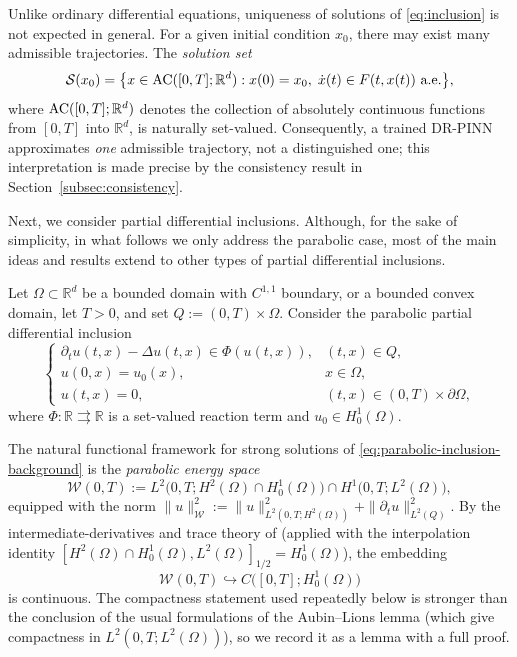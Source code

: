 \documentclass[11pt]{elsarticle}
\theoremstyle{definition}
\theoremstyle{remark}
\numberwithin{equation}{section}
\begin{document}
	Unlike ordinary differential equations, uniqueness of solutions of
	\eqref{eq:inclusion} is not expected in general.  For a given initial
	condition $x_0$, there may exist many admissible trajectories.  The
	\emph{solution set}
	\begin{equation}\label{eq:solution-DI}
		\mathcal{S}(x_0)
		=
		\bigl\{
		x\in {\rm AC}([0,T];\mathbb{R}^d):
		x(0)=x_0,\;
		\dot{x}(t)\in F(t,x(t))\ \text{a.e.}
		\bigr\},
	\end{equation}
	where ${\rm AC}([0,T];\mathbb{R}^d)$ denotes the collection of
	absolutely continuous functions from $[0,T]$ into $\mathbb{R}^d$,
	is naturally set-valued.  Consequently, a trained DR-PINN approximates
	\emph{one} admissible trajectory, not a distinguished one; this
	interpretation is made precise by the consistency result in
	Section~\ref{subsec:consistency}.

Next, we consider partial differential inclusions. Although, for the sake of simplicity, in what follows we only address the parabolic case, most of the main ideas and results extend to other types of partial differential inclusions. 

Let $\Omega\subset\mathbb{R}^d$ be a bounded domain with $C^{1,1}$ boundary, or a bounded convex domain, let $T>0$, and set
$Q:=(0,T)\times\Omega$.  Consider the parabolic partial differential
inclusion
\begin{equation}\label{eq:parabolic-inclusion-background}
	\left\{
	\begin{array}{ll}
		\partial_t u(t,x)-\Delta u(t,x)\in\Phi(u(t,x)), & (t,x)\in Q,\\[4pt]
		u(0,x)=u_0(x), & x\in\Omega,\\[4pt]
		u(t,x)=0, & (t,x)\in(0,T)\times\partial\Omega,
	\end{array}
	\right.
\end{equation}
where $\Phi:\mathbb{R}\rightrightarrows\mathbb{R}$ is a set-valued reaction
term and $u_0\in H_0^1(\Omega)$.

The natural functional framework for strong solutions of
\eqref{eq:parabolic-inclusion-background} is the \emph{parabolic energy
space}
\[
\mathcal{W}(0,T)
:=
L^2\bigl(0,T;H^2(\Omega)\cap H_0^1(\Omega)\bigr)
\cap
H^1\bigl(0,T;L^2(\Omega)\bigr),
\]
equipped with the norm
$\|u\|_{\mathcal{W}}^2:=\|u\|_{L^2(0,T;H^2(\Omega))}^2
+\|\partial_t u\|_{L^2(Q)}^2$.  By the intermediate-derivatives and trace
theory of \cite[Chapter~1, Theorem~3.1]{LionsMagenes} (applied with the
interpolation identity
$[H^2(\Omega)\cap H_0^1(\Omega),L^2(\Omega)]_{1/2}=H_0^1(\Omega)$), the
embedding
\begin{equation}\label{eq:W-cont-embedding}
	\mathcal{W}(0,T)\hookrightarrow C\bigl([0,T];H_0^1(\Omega)\bigr)
\end{equation}
is continuous. The compactness statement used repeatedly below is stronger
than the conclusion of the usual formulations of the Aubin--Lions lemma
(which give compactness in $L^2(0,T;L^2(\Omega))$), so we record it as a
lemma with a full proof.
\end{document}
